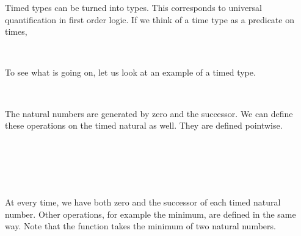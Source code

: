 Timed types can be turned into types.
This corresponds to universal quantification in first order logic.
If we think of a time type as a predicate on times, 

\begin{code}%
\>[0]\AgdaSpace{}%
\AgdaSymbol{:}\AgdaSpace{}%
\AgdaSpace{}%
\AgdaSpace{}%
\<%
\\
\>[0]\AgdaSpace{}%
\AgdaSpace{}%
\AgdaSymbol{=}\AgdaSpace{}%
\AgdaSymbol{\{}\AgdaSpace{}%
\AgdaSymbol{:}\AgdaSpace{}%
\AgdaSymbol{\}}\AgdaSpace{}%
\AgdaSpace{}%
\AgdaSpace{}%
\<%
\end{code}

To see what is going on, let us look at an example of a timed type.

\begin{code}%
\>[0]\AgdaSpace{}%
\AgdaSymbol{:}\AgdaSpace{}%
\<%
\\
\>[0]\AgdaSpace{}%
\AgdaSymbol{=}\AgdaSpace{}%
\AgdaSpace{}%
\<%
\end{code}

The natural numbers are generated by zero and the successor.
We can define these operations on the timed natural as well.
They are defined pointwise.

\begin{code}%
\>[0]\AgdaSpace{}%
\AgdaSymbol{:}\AgdaSpace{}%
\AgdaSpace{}%
\<%
\\
\>[0]\AgdaSpace{}%
\AgdaSymbol{=}\AgdaSpace{}%
\<%
\\
%
\\[\AgdaEmptyExtraSkip]%
\>[0]\AgdaSpace{}%
\AgdaSymbol{:}\AgdaSpace{}%
\AgdaSymbol{(}\AgdaSpace{}%
\AgdaSpace{}%
\AgdaSymbol{)}\<%
\\
\>[0]\AgdaSpace{}%
\AgdaSpace{}%
\AgdaSymbol{=}\AgdaSpace{}%
\AgdaSpace{}%
\<%
\end{code}

At every time, we have both zero and the successor of each timed natural number.
Other operations, for example the minimum, are defined in the same way.
Note that the function  takes the minimum of two natural numbers.

